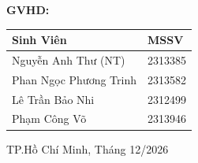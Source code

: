 \begin{titlepage}
\begin{center}
\vspace{0.7cm}
{\fontsize{15}{18}\selectfont\bfseries GVHD: \GVHD\par}

\vspace{0.3cm}
{\fontsize{12}{18}\selectfont
\renewcommand{\arraystretch}{1.28}
\begin{tabular}{|p{6.5cm}<{\centering}|p{3.5cm}<{\centering}|}
\hline
\textbf{Sinh Viên} & \textbf{MSSV} \\ \hline
Nguyễn Anh Thư (NT) & 2313385 \\ \hline
Phan Ngọc Phương Trinh & 2313582 \\ \hline
Lê Trần Bảo Nhi & 2312499 \\ \hline
Phạm Công Võ & 2313946 \\ \hline
\end{tabular}\par}

\vfill
{\fontsize{13}{19}\selectfont TP.Hồ Chí Minh, Tháng 12/2026\par}
\vspace*{0.1cm}

\end{center}
\end{titlepage}
\restoregeometry
